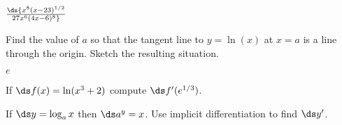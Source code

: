 \begin{exercises}
\begin{exercise} $\ds {x^8 (x-23)^{1/2}\over 27 x^6(4x-6)^8 }$
\end{exercise}

\endtwocol
\bsk
\begin{exercise} Find the value of $a$ so that the tangent line to
$y=\ln(x)$ at $x=a$ is a line through the origin.  Sketch the
 resulting situation.
\begin{answer} $e$
\end{answer}\end{exercise}

\begin{exercise} If $\ds f(x) = \ln(x^3 + 2)$ compute $\ds f'(e^{1/3})$.
\end{exercise}

\begin{exercise} If $\ds y=\log_a x$ then $\ds a^y=x$. Use implicit
differentiation to find $\ds y'$.
\end{exercise}

\end{exercises}

